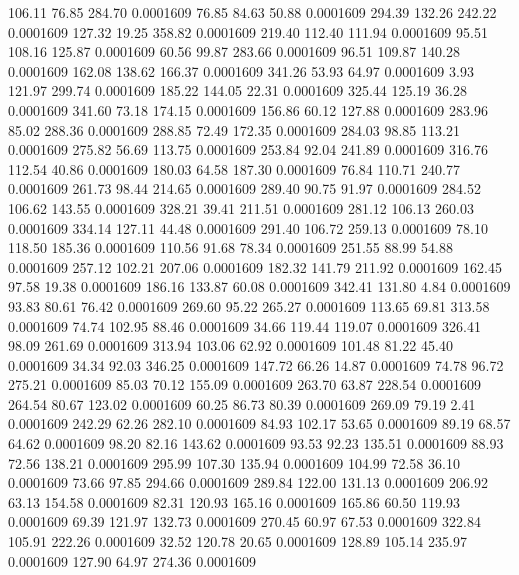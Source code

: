  106.11   76.85  284.70   0.0001609
  76.85   84.63   50.88   0.0001609
 294.39  132.26  242.22   0.0001609
 127.32   19.25  358.82   0.0001609
 219.40  112.40  111.94   0.0001609
  95.51  108.16  125.87   0.0001609
  60.56   99.87  283.66   0.0001609
  96.51  109.87  140.28   0.0001609
 162.08  138.62  166.37   0.0001609
 341.26   53.93   64.97   0.0001609
   3.93  121.97  299.74   0.0001609
 185.22  144.05   22.31   0.0001609
 325.44  125.19   36.28   0.0001609
 341.60   73.18  174.15   0.0001609
 156.86   60.12  127.88   0.0001609
 283.96   85.02  288.36   0.0001609
 288.85   72.49  172.35   0.0001609
 284.03   98.85  113.21   0.0001609
 275.82   56.69  113.75   0.0001609
 253.84   92.04  241.89   0.0001609
 316.76  112.54   40.86   0.0001609
 180.03   64.58  187.30   0.0001609
  76.84  110.71  240.77   0.0001609
 261.73   98.44  214.65   0.0001609
 289.40   90.75   91.97   0.0001609
 284.52  106.62  143.55   0.0001609
 328.21   39.41  211.51   0.0001609
 281.12  106.13  260.03   0.0001609
 334.14  127.11   44.48   0.0001609
 291.40  106.72  259.13   0.0001609
  78.10  118.50  185.36   0.0001609
 110.56   91.68   78.34   0.0001609
 251.55   88.99   54.88   0.0001609
 257.12  102.21  207.06   0.0001609
 182.32  141.79  211.92   0.0001609
 162.45   97.58   19.38   0.0001609
 186.16  133.87   60.08   0.0001609
 342.41  131.80    4.84   0.0001609
  93.83   80.61   76.42   0.0001609
 269.60   95.22  265.27   0.0001609
 113.65   69.81  313.58   0.0001609
  74.74  102.95   88.46   0.0001609
  34.66  119.44  119.07   0.0001609
 326.41   98.09  261.69   0.0001609
 313.94  103.06   62.92   0.0001609
 101.48   81.22   45.40   0.0001609
  34.34   92.03  346.25   0.0001609
 147.72   66.26   14.87   0.0001609
  74.78   96.72  275.21   0.0001609
  85.03   70.12  155.09   0.0001609
 263.70   63.87  228.54   0.0001609
 264.54   80.67  123.02   0.0001609
  60.25   86.73   80.39   0.0001609
 269.09   79.19    2.41   0.0001609
 242.29   62.26  282.10   0.0001609
  84.93  102.17   53.65   0.0001609
  89.19   68.57   64.62   0.0001609
  98.20   82.16  143.62   0.0001609
  93.53   92.23  135.51   0.0001609
  88.93   72.56  138.21   0.0001609
 295.99  107.30  135.94   0.0001609
 104.99   72.58   36.10   0.0001609
  73.66   97.85  294.66   0.0001609
 289.84  122.00  131.13   0.0001609
 206.92   63.13  154.58   0.0001609
  82.31  120.93  165.16   0.0001609
 165.86   60.50  119.93   0.0001609
  69.39  121.97  132.73   0.0001609
 270.45   60.97   67.53   0.0001609
 322.84  105.91  222.26   0.0001609
  32.52  120.78   20.65   0.0001609
 128.89  105.14  235.97   0.0001609
 127.90   64.97  274.36   0.0001609
